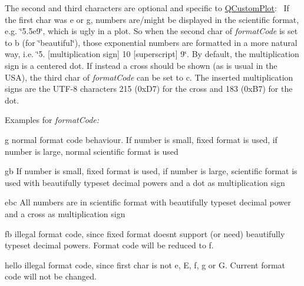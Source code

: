 The second and third characters are optional and specific to \mbox{\hyperlink{class_q_custom_plot}{Q\+Custom\+Plot}}\+:~\newline
If the first char was \textquotesingle{}e\textquotesingle{} or \textquotesingle{}g\textquotesingle{}, numbers are/might be displayed in the scientific format, e.\+g. \char`\"{}5.\+5e9\char`\"{}, which is ugly in a plot. So when the second char of {\itshape format\+Code} is set to \textquotesingle{}b\textquotesingle{} (for \char`\"{}beautiful\char`\"{}), those exponential numbers are formatted in a more natural way, i.\+e. \char`\"{}5.
\mbox{[}multiplication sign\mbox{]} 10 \mbox{[}superscript\mbox{]} 9\char`\"{}. By default, the multiplication sign is a centered dot. If instead a cross should be shown (as is usual in the U\+SA), the third char of {\itshape format\+Code} can be set to \textquotesingle{}c\textquotesingle{}. The inserted multiplication signs are the U\+T\+F-\/8 characters 215 (0x\+D7) for the cross and 183 (0x\+B7) for the dot.

Examples for {\itshape format\+Code\+:} \begin{DoxyItemize}
\item {\ttfamily g} normal format code behaviour. If number is small, fixed format is used, if number is large, normal scientific format is used \item {\ttfamily gb} If number is small, fixed format is used, if number is large, scientific format is used with beautifully typeset decimal powers and a dot as multiplication sign \item {\ttfamily ebc} All numbers are in scientific format with beautifully typeset decimal power and a cross as multiplication sign \item {\ttfamily fb} illegal format code, since fixed format doesn\textquotesingle{}t support (or need) beautifully typeset decimal powers. Format code will be reduced to \textquotesingle{}f\textquotesingle{}. \item {\ttfamily hello} illegal format code, since first char is not \textquotesingle{}e\textquotesingle{}, \textquotesingle{}E\textquotesingle{}, \textquotesingle{}f\textquotesingle{}, \textquotesingle{}g\textquotesingle{} or \textquotesingle{}G\textquotesingle{}. Current format code will not be changed. \end{DoxyItemize}
\mbox{\label{class_q_c_p_axis_a21dc8023ad7500382ad9574b48137e63}} 
